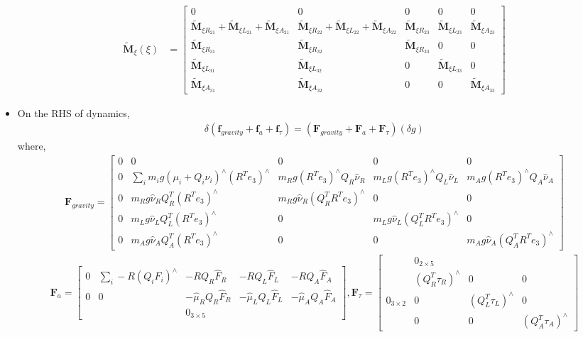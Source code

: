 \documentclass[10pt]{article}
\begin{document}
\begin{itemize}
\begin{align}
\\
{\tilde{\mathbf{M}}_\xi}(\xi) &= \begin{bmatrix}
0 & 0 & 0 & 0 & 0 \\
\tilde{\mathbf{M}}_{\xi R_{21}} + \tilde{\mathbf{M}}_{\xi L_{21}} + \tilde{\mathbf{M}}_{\xi A_{21}} & \tilde{\mathbf{M}}_{\xi R_{22}} + \tilde{\mathbf{M}}_{\xi L_{22}} + \tilde{\mathbf{M}}_{\xi A_{22}}
& \tilde{\mathbf{M}}_{\xi R_{23}} 
& \tilde{\mathbf{M}}_{\xi L_{23}} 
& \tilde{\mathbf{M}}_{\xi A_{23}} \\
\tilde{\mathbf{M}}_{\xi R_{31}} & \tilde{\mathbf{M}}_{\xi R_{32}} &  \tilde{\mathbf{M}}_{\xi R_{33}}
& 0 & 0 \\
\tilde{\mathbf{M}}_{\xi L_{31}} & \tilde{\mathbf{M}}_{\xi L_{32}} & 0
& \tilde{\mathbf{M}}_{\xi L_{33}} & 0 \\
\tilde{\mathbf{M}}_{\xi A_{31}} & \tilde{\mathbf{M}}_{\xi A_{32}} & 0 & 0 & \tilde{\mathbf{M}}_{\xi A_{33}}
\end{bmatrix}
\end{align}

\item On the RHS of dynamics,
\begin{align*}
\delta (\mathbf{f}_{gravity} + \mathbf{f}_a + \mathbf{f}_\tau) = (\mathbf{F}_{gravity} + \mathbf{F}_a + \mathbf{F}_\tau) (\delta g)
\end{align*}
where,
{\small \begin{align}
\mathbf{F}_{gravity} = \begin{bmatrix}
0 & 0 & 0 & 0 & 0 \\
0 & \sum_{i} m_i g (\mu_i + Q_i \nu_i)^\wedge (R^T e_3)^\wedge & m_Rg (R^T e_3)^\wedge Q_R \hat{\nu}_R & m_Lg (R^T e_3)^\wedge Q_L \hat{\nu}_L & m_Ag (R^T e_3)^\wedge Q_A \hat{\nu}_A \\
0 & m_R g \hat\nu_R Q_R^T (R^T e_3)^\wedge & m_R g \hat\nu_R (Q_R^T R^T e_3)^\wedge & 0 & 0\\
0 & m_L g \hat\nu_L Q_L^T (R^T e_3)^\wedge & 0 & m_L g \hat\nu_L (Q_L^T R^T e_3)^\wedge & 0 \\
0 & m_A g \hat\nu_A Q_A^T (R^T e_3)^\wedge & 0 & 0 & m_A g \hat\nu_A (Q_A^T R^T e_3)^\wedge
\end{bmatrix}
\end{align}
\begin{align}
\mathbf{F}_a =  \begin{bmatrix}
0 & \sum_{i} -R(Q_i F_i)^\wedge & -RQ_R\hat{F}_R & -RQ_L\hat{F}_L & -RQ_A\hat{F}_A \\
0 & 0 & -\hat{\mu}_R Q_R \hat{F}_R & -\hat{\mu}_L Q_L \hat{F}_L & -\hat{\mu}_A Q_A \hat{F}_A\\
& & 0_{3 \times 5} & &
\end{bmatrix}
,\mathbf{F}_\tau = \begin{bmatrix}
 & 0_{2\times 5} &  &  \\
 & (Q_R^T \tau_R)^\wedge & 0 & 0 \\
0_{3 \times 2} & 0 & (Q_L^T \tau_L)^\wedge & 0 \\
 &  0 & 0 & (Q_A^T \tau_A)^\wedge
\end{bmatrix}
\end{align}}
\end{itemize}
\end{document}
